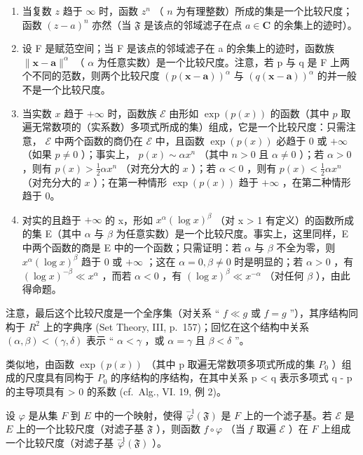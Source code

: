 \begin{enumerate}
\def\labelenumi{\arabic{enumi})}
\setcounter{enumi}{1}
\item
  当复数 \(z\) 趋于 \(\infty\) 时，函数 \(z^n\) （ \(n\) 为有理整数）所成的集是一个比较尺度；函数 \((z - a)^n\) 亦然（当 \(\mathfrak{F}\) 是该点的邻域滤子在点 \(a \in \mathbf{C}\) 的余集上的迹时）。
\item
  设 F 是赋范空间；当 F 是该点的邻域滤子在 a 的余集上的迹时，函数族 \(\|\mathbf{x}-\mathbf{a}\|^{\alpha}\) （ \(\alpha\) 为任意实数）是一个比较尺度。注意，若 p 与 q 是 F 上两个不同的范数，则两个比较尺度 \(\left(p(\mathbf{x}-\mathbf{a})\right)^{\alpha}\) 与 \(\left(q(\mathbf{x}-\mathbf{a})\right)^{\alpha}\) 的并一般不是一个比较尺度。
\item
  当实数 \(x\) 趋于 \(+\infty\) 时，函数族 \(\mathcal{E}\) 由形如 \(\exp(p(x))\) 的函数（其中 \(p\) 取遍无常数项的（实系数）多项式所成的集）组成，它是一个比较尺度：只需注意， \(\mathcal{E}\) 中两个函数的商仍在 \(\mathcal{E}\) 中，且函数 \(\exp(p(x))\) 必趋于 0 或 \(+\infty\) （如果 \(p \neq 0\) ）；事实上， \(p(x) \sim \alpha x^n\) （其中 \(n > 0\) 且 \(\alpha \neq 0\) ）；若 \(\alpha > 0\) ，则有 \(p(x) > \frac{1}{2}\alpha x^n\) （对充分大的 \(x\) ）；若 \(\alpha < 0\) ，则有 \(p(x) < \frac{1}{2}\alpha x^n\) （对充分大的 \(x\) ）；在第一种情形 \(\exp(p(x))\) 趋于 \(+\infty\) ，在第二种情形趋于 0。
\item
  对实的且趋于 \(+\infty\) 的 x，形如 \(x^{\alpha}(\log x)^{\beta}\) （对 x \textgreater{} 1 有定义）的函数所成的集 E（其中 \(\alpha\) 与 \(\beta\) 为任意实数）是一个比较尺度。事实上，这里同样，E 中两个函数的商是 E 中的一个函数；只需证明：若 \(\alpha\) 与 \(\beta\) 不全为零，则 \(x^{\alpha}(\log x)^{\beta}\) 趋于 0 或 \(+\infty\) ；这在 \(\alpha = 0, \beta \neq 0\) 时是明显的；若 \(\alpha > 0\) ，有 \((\log x)^{-\beta} \ll x^{\alpha}\) ，而若 \(\alpha < 0\) ，有 \((\log x)^{\beta} \ll x^{-\alpha}\) （对任何 \(\beta\) ），由此得命题。
\end{enumerate}

注意，最后这个比较尺度是一个全序集（对关系 “ \(f \ll g\) 或 \(f = g\) ”），其序结构同构于 \(R^{2}\) 上的字典序 (Set Theory, III, p.~157)；回忆在这个结构中关系 \((\alpha, \beta) < (\gamma, \delta)\) 表示 “ \(\alpha < \gamma\) ，或 \(\alpha = \gamma\) 且 \(\beta < \delta\) ”。

类似地，由函数 \(\exp(p(x))\) （其中 p 取遍无常数项多项式所成的集 \(P_{0}\) ）组成的尺度具有同构于 \(P_{0}\) 的序结构的序结构，在其中关系 p \textless{} q 表示多项式 q - p 的主导项具有 \textgreater{} 0 的系数 (cf.~Alg., VI. 19, 例 2)。

设 \(\varphi\) 是从集 \(F\) 到 \(E\) 中的一个映射，使得 \(\overset{-1}{\varphi}(\mathfrak{F})\) 是 \(F\) 上的一个滤子基。若 \(\mathcal{E}\) 是 \(E\) 上的一个比较尺度（对滤子基 \(\mathfrak{F}\) ），则函数 \(f \circ \varphi\) （当 \(f\) 取遍 \(\mathcal{E}\) ）在 \(F\) 上组成一个比较尺度（对滤子基 \(\overset{-1}{\varphi}(\mathfrak{F})\) ）。

